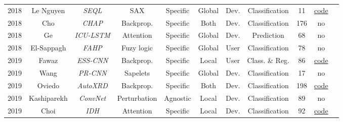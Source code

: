 \begin{table*}[h!]
\begin{tabular}{@{}ccccccccccc@{}}
    2018        & Le Nguyen\cite{nguyen_interpretable_2018}&\textit{SEQL}&SAX        &Specific       & Global        & Dev.      & Classification                    & 11                & \href{https://github.com/lnthach/Mr-SEQL}{code}\\ 

    2018        & Cho\cite{cho_interpretation_2020}   &\textit{CHAP}      & Backprop.     & Specific      & Both          & Dev.      & Classification                           & 176               & no\\

    2018        & Ge\cite{ge_interpretable_2018}      &\textit{\footnotesize{ICU-LSTM}}  & Attention     &Specific       & Global        & Dev.      & Prediction                        & 68                & no \\  

    2018        & El-Sappagh\cite{el-sappagh_ontology-based_2018}   & \textit{FAHP}     & Fuzy logic    &Specific       & Global        & User      & Classification                    & 78                & no\\ 

    2019        &   Fawaz \cite{ismail_fawaz_accurate_2019}  & \textit{\footnotesize{ESS-CNN}}  & Backprop.     &Specific       & Local         & User   & Class. \& Reg.                    & 86                & \href{https://github.com/hfawaz/ijcars19}{code}\\ 

    2019        &  Wang\cite{wang_learning_2019}      &\textit{PR-CNN} & Sapelets      &Specific       & Global        & Dev.      & Classification                    & 17                & no\\ 

    2019        &   Oviedo \cite{oviedo_fast_2019}    & \textit{AutoXRD}  & Backprop.     &Specific       & Both          & Dev.      & Classification                    & 198               & \href{https://github.com/PV-Lab/autoXRD/tree/master}{code}\\ 

    2019        & Kashiparekh\cite{kashiparekh_convtimenet_2019}&\textit{ConvNet}& Perturbation  &Agnostic       & Local         & Dev.      & Classification                    & 89                & no \\ 

    2019        & Choi\cite{choi_fully_2021}               &\textit{IDH}& Attention   &Specific       & Local         & Dev.      & Classification                                 & 92                & \href{https://github.com/yoonchoi-neuro/automated_hybrid_IDH}{code}\\  


\end{tabular}
\end{table*}
